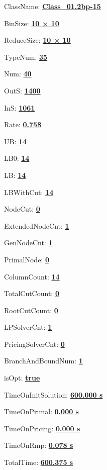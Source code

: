 \documentclass[11pt]{article}
\begin{document}
\pagestyle{empty}


ClassName: \underline{\textbf{Class_01.2bp-15}}
\par
BinSize: \underline{\textbf{10 × 10}}
\par
ReduceSize: \underline{\textbf{10 × 10}}
\par
TypeNum: \underline{\textbf{35}}
\par
Num: \underline{\textbf{40}}
\par
OutS: \underline{\textbf{1400}}
\par
InS: \underline{\textbf{1061}}
\par
Rate: \underline{\textbf{0.758}}
\par
UB: \underline{\textbf{14}}
\par
LB0: \underline{\textbf{14}}
\par
LB: \underline{\textbf{14}}
\par
LBWithCut: \underline{\textbf{14}}
\par
NodeCut: \underline{\textbf{0}}
\par
ExtendedNodeCnt: \underline{\textbf{1}}
\par
GenNodeCnt: \underline{\textbf{1}}
\par
PrimalNode: \underline{\textbf{0}}
\par
ColumnCount: \underline{\textbf{14}}
\par
TotalCutCount: \underline{\textbf{0}}
\par
RootCutCount: \underline{\textbf{0}}
\par
LPSolverCnt: \underline{\textbf{1}}
\par
PricingSolverCnt: \underline{\textbf{0}}
\par
BranchAndBoundNum: \underline{\textbf{1}}
\par
isOpt: \underline{\textbf{true}}
\par
TimeOnInitSolution: \underline{\textbf{600.000 s}}
\par
TimeOnPrimal: \underline{\textbf{0.000 s}}
\par
TimeOnPricing: \underline{\textbf{0.000 s}}
\par
TimeOnRmp: \underline{\textbf{0.078 s}}
\par
TotalTime: \underline{\textbf{600.375 s}}
\par
\newpage


\end{document}
